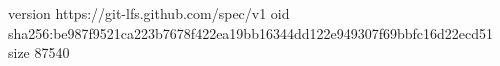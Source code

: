 version https://git-lfs.github.com/spec/v1
oid sha256:be987f9521ca223b7678f422ea19bb16344dd122e949307f69bbfc16d22ecd51
size 87540
